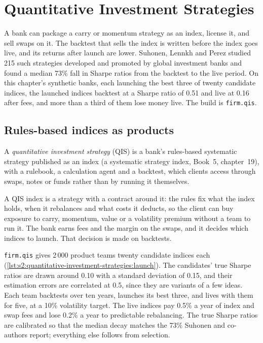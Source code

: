 \chapter{Quantitative Investment Strategies}\label{ch:s2:quantitative-investment-strategies}

A bank can package a carry or momentum strategy as an index, license it, and sell swaps on it. The backtest that sells the index is written before the
index goes live, and its returns after launch are lower. Suhonen, Lennkh and Perez studied 215 such strategies developed and promoted by global
investment banks and found a median 73\% fall in Sharpe ratios from the backtest to the live period. On this chapter's synthetic banks, each launching
the best three of twenty candidate indices, the launched indices backtest at a Sharpe ratio of 0.51 and live at 0.16 after fees, and more than a third
of them lose money live. The build is \texttt{firm.qis}.

\section{Rules-based indices as products}

\begin{definition}\label{def:s2:quantitative-investment-strategies:qis}
A \emph{quantitative investment strategy} (QIS) is a bank's rules-based systematic strategy published as an
index (a systematic strategy index, Book~5, chapter~19), with a rulebook, a calculation agent and a backtest, which clients access through swaps,
notes or funds rather than by running it themselves.
\end{definition}

A QIS index is a strategy with a contract around it: the rules fix what the index holds, when it rebalances and what costs it deducts, so the client
can buy exposure to carry, momentum, value or a volatility premium without a team to run it. The bank earns fees and the margin on the swaps, and it
decides which indices to launch. That decision is made on backtests.

\texttt{firm.qis} gives 2\,000 product teams twenty candidate indices each (\cref{lst:s2:quantitative-investment-strategies:launch}). The candidates'
true Sharpe ratios are drawn around 0.10 with a standard deviation of 0.15, and their estimation errors are correlated at 0.5, since they are variants
of a few ideas. Each team backtests over ten years, launches its best three, and lives with them for five, at a 10\% volatility target. The live
indices pay 0.5\% a year of index and swap fees and lose 0.2\% a year to predictable rebalancing. The true Sharpe ratios are calibrated so that the
median decay matches the 73\% Suhonen and co-authors report; everything else follows from selection.


